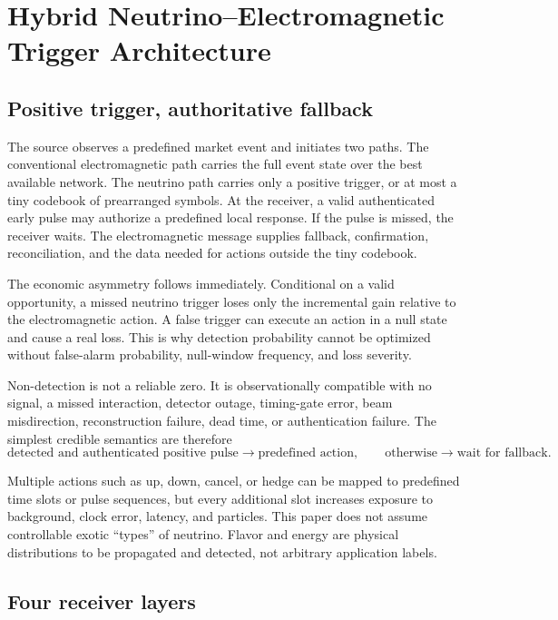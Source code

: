 \documentclass[11pt]{article}
\begin{document}
\section{Hybrid Neutrino--Electromagnetic Trigger Architecture}

\subsection{Positive trigger, authoritative fallback}

The source observes a predefined market event and initiates two paths. The conventional electromagnetic path carries the full event state over the best available network. The neutrino path carries only a positive trigger, or at most a tiny codebook of prearranged symbols. At the receiver, a valid authenticated early pulse may authorize a predefined local response. If the pulse is missed, the receiver waits. The electromagnetic message supplies fallback, confirmation, reconciliation, and the data needed for actions outside the tiny codebook.

The economic asymmetry follows immediately. Conditional on a valid opportunity, a missed neutrino trigger loses only the incremental gain relative to the electromagnetic action. A false trigger can execute an action in a null state and cause a real loss. This is why detection probability cannot be optimized without false-alarm probability, null-window frequency, and loss severity.

Non-detection is not a reliable zero. It is observationally compatible with no signal, a missed interaction, detector outage, timing-gate error, beam misdirection, reconstruction failure, dead time, or authentication failure. The simplest credible semantics are therefore
\begin{equation}
\text{detected and authenticated positive pulse}\rightarrow\text{predefined action},
\qquad
\text{otherwise}\rightarrow\text{wait for fallback}.
\end{equation}

Multiple actions such as up, down, cancel, or hedge can be mapped to predefined time slots or pulse sequences, but every additional slot increases exposure to background, clock error, latency, and particles. This paper does not assume controllable exotic ``types'' of neutrino. Flavor and energy are physical distributions to be propagated and detected, not arbitrary application labels.

\subsection{Four receiver layers}
\end{document}
